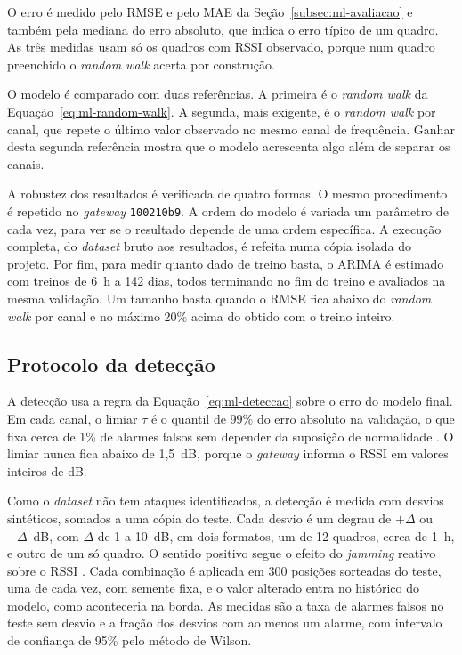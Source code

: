 O erro é medido pelo RMSE e pelo MAE da Seção~\ref{subsec:ml-avaliacao} e
também pela mediana do erro absoluto, que indica o erro típico de um quadro.
As três medidas usam só os quadros com RSSI observado, porque num quadro
preenchido o \textit{random walk} acerta por construção.

O modelo é comparado com duas referências. A primeira é o \textit{random walk}
da Equação~\ref{eq:ml-random-walk}. A segunda, mais exigente, é o
\textit{random walk} por canal, que repete o último valor observado no mesmo
canal de frequência. Ganhar desta segunda referência mostra que o modelo
acrescenta algo além de separar os canais.

A robustez dos resultados é verificada de quatro formas. O mesmo procedimento é
repetido no \textit{gateway} \texttt{100210b9}. A ordem do modelo é variada um
parâmetro de cada vez, para ver se o resultado depende de uma ordem
específica. A execução completa, do \textit{dataset} bruto aos resultados, é
refeita numa cópia isolada do projeto. Por fim, para medir quanto dado de
treino basta, o ARIMA é estimado com treinos de 6~h a 142 dias, todos
terminando no fim do treino e avaliados na mesma validação. Um tamanho basta
quando o RMSE fica abaixo do \textit{random walk} por canal e no máximo 20\%
acima do obtido com o treino inteiro.

\subsection{Protocolo da detecção}
\label{subsec:ml-protocolo-deteccao}

A detecção usa a regra da Equação~\ref{eq:ml-deteccao} sobre o erro do modelo
final. Em cada canal, o limiar $\tau$ é o quantil de 99\% do erro absoluto na
validação, o que fixa cerca de 1\% de alarmes falsos sem depender da suposição
de normalidade \cite{hundman2018spacecraft}. O limiar nunca fica abaixo de
1,5~dB, porque o \textit{gateway} informa o RSSI em valores inteiros de dB.

Como o \textit{dataset} não tem ataques identificados, a detecção é medida com
desvios sintéticos, somados a uma cópia do teste. Cada desvio é um degrau de
$+\Delta$ ou $-\Delta$~dB, com $\Delta$ de 1 a 10~dB, em dois formatos, um de 12
quadros, cerca de 1~h, e outro de um só quadro. O sentido positivo segue o
efeito do \textit{jamming} reativo sobre o RSSI \cite{ruotsalainen2022jamming}.
Cada combinação é aplicada em 300 posições sorteadas do teste, uma de cada vez,
com semente fixa, e o valor alterado entra no histórico do modelo, como
aconteceria na borda. As medidas são a taxa de alarmes falsos no teste sem
desvio e a fração dos desvios com ao menos um alarme, com intervalo de
confiança de 95\% pelo método de Wilson.


